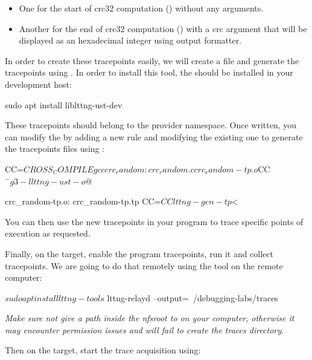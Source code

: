 \begin{itemize}
  \item One for the start of crc32 computation ()
    without any arguments.
  \item Another for the end of crc32 computation () with
      a crc  argument that will be displayed as an hexadecimal integer
      using  output formatter.
\end{itemize}

In order to create these tracepoints easily, we will create a
 file and generate the tracepoints using
. In order to install this tool, the 
should be installed in your development host:

\begin{bashinput}
sudo apt install liblttng-ust-dev
\end{bashinput}

These tracepoints should belong to the 
provider namespace. Once written, you can modify the  by adding a
new rule and modifying the existing one to generate the tracepoints files using
:

\begin{bashinput}
  CC=${CROSS_COMPILE}gcc

  crc_random: crc_random.c crc_random-tp.o
      ${CC} $^ -g3 -llttng-ust -o $@

  crc_random-tp.o: crc_random-tp.tp
      CC=${CC} lttng-gen-tp $<
\end{bashinput}

You can then use the new tracepoints in your program to trace specific points
of execution as requested.

Finally, on the target, enable the program tracepoints, run it and collect
tracepoints. We are going to do that remotely using the  tool
on the remote computer:

\begin{bashinput}
$ sudo apt install lttng-tools
$ lttng-relayd --output=~/debugging-labs/traces
\end{bashinput}

{\em Make sure not give a path inside the nfsroot to  on your computer,
otherwise it may encounter permission issues and will fail to create the traces directory}.

Then on the target, start the trace acquisition using:

